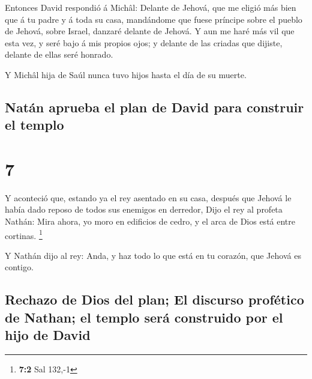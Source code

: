 Entonces David respondió á Michâl: Delante de Jehová,
que me eligió más bien que á tu padre y á toda su casa, mandándome que
fuese príncipe sobre el pueblo de Jehová, sobre Israel, danzaré delante
de Jehová.  Y aun me haré más vil que esta vez, y seré
bajo á mis propios ojos; y delante de las criadas que dijiste, delante
de ellas seré honrado.

 Y Michâl hija de Saúl nunca tuvo hijos hasta el día de
su muerte.

\hypertarget{natuxe1n-aprueba-el-plan-de-david-para-construir-el-templo}{%
\subsection{Natán aprueba el plan de David para construir el
templo}\label{natuxe1n-aprueba-el-plan-de-david-para-construir-el-templo}}

\hypertarget{section-6}{%
\section{7}\label{section-6}}

 Y aconteció que, estando ya el rey asentado en su casa,
después que Jehová le había dado reposo de todos sus enemigos en
derredor,  Dijo el rey al profeta Nathán: Mira ahora, yo
moro en edificios de cedro, y el arca de Dios está entre cortinas.
\footnote{\textbf{7:2} Sal 132,-1}

 Y Nathán dijo al rey: Anda, y haz todo lo que está en tu
corazón, que Jehová es contigo.

\hypertarget{rechazo-de-dios-del-plan-el-discurso-profuxe9tico-de-nathan-el-templo-seruxe1-construido-por-el-hijo-de-david}{%
\subsection{Rechazo de Dios del plan; El discurso profético de Nathan;
el templo será construido por el hijo de
David}\label{rechazo-de-dios-del-plan-el-discurso-profuxe9tico-de-nathan-el-templo-seruxe1-construido-por-el-hijo-de-david}}

